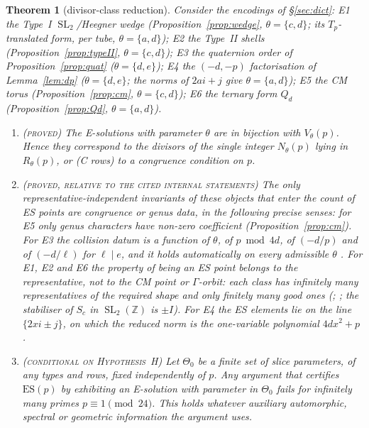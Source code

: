 \documentclass[10pt,reqno]{amsart}
\newtheorem{theorem}{Theorem}[section]
\theoremstyle{definition}
\numberwithin{equation}{section}
\newcommand{\Z}{\mathbb Z}
\DeclareMathOperator{\SL}{SL}
\newcommand{\status}[1]{\textup{\textsc{#1}}}
\begin{document}
\begin{theorem}[divisor-class reduction]\label{thm:reduction}
Consider the encodings of \S\ref{sec:dict}:
E1 the Type~I $\SL_2$/Heegner wedge (Proposition~\ref{prop:wedge},
$\theta=\{c,d\}$; its $T_p$-translated form, per tube, $\theta=\{a,d\}$);
E2 the Type~II shells (Proposition~\ref{prop:typeII}, $\theta=\{c,d\}$);
E3 the quaternion order of Proposition~\ref{prop:quat} ($\theta=\{d,e\}$);
E4 the $(-d,-p)$ factorisation of Lemma~\ref{lem:dp} ($\theta=\{d,e\}$;
the norms of $2ai+j$ give $\theta=\{a,d\}$);
E5 the CM torus (Proposition~\ref{prop:cm}, $\theta=\{c,d\}$);
E6 the ternary form $Q_d$ (Proposition~\ref{prop:Qd}, $\theta=\{a,d\}$).
\begin{enumerate}
\item[(i)] \status{(proved)} The E-solutions with parameter $\theta$ are in
bijection with $V_\theta(p)$. Hence they correspond to the divisors of the
single integer $N_\theta(p)$ lying in $R_\theta(p)$, or (C rows) to a
congruence condition on $p$.
\item[(ii)] \status{(proved, relative to the cited internal statements)}
The only representative-independent invariants of these objects that
enter the count of ES points are congruence or genus data, in the
following precise senses: for E5 only genus characters have non-zero
coefficient (Proposition~\ref{prop:cm}). For E3 the collision datum is a
function of $\theta$, of $p\bmod4d$, of $(-d/p)$ and of $(-d/\ell)$ for
$\ell\mid e$, and it holds automatically on every admissible $\theta$
\cite[Prop.~2.2]{O130}. For E1, E2 and E6 the property of being an ES point
belongs to the representative, not to the CM point or $\Gamma$-orbit: each
class has infinitely many representatives of the required shape and only
finitely many good ones (\cite[Prop.~4.1]{O126}; \cite[Prop.~8.2]{O128}; the
stabiliser of $S_c$ in $\SL_2(\Z)$ is $\pm I$). For E4 the ES elements lie
on the line $\{2xi\pm j\}$, on which the reduced norm is the one-variable
polynomial $4dx^2+p$ \cite[Prop.~3.2]{O130}.
\item[(iii)] \status{(conditional on Hypothesis~H)} Let $\Theta_0$ be a finite
set of slice parameters, of any types and rows, fixed independently of
$p$. Any argument that certifies $\mathrm{ES}(p)$ by exhibiting an
E-solution with parameter in $\Theta_0$ fails for infinitely many primes
$p\equiv1\pmod{24}$. This holds whatever auxiliary automorphic, spectral
or geometric information the argument uses.
\end{enumerate}
\end{theorem}
\end{document}
